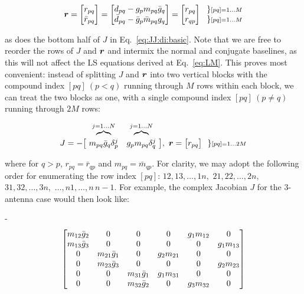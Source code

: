 \documentclass[useAMS,usenatbib]{mn2e}
\newcommand{\JJ}{J} %
\begin{document}
\[
\bmath{r} = \Matrix{c}{ r_{pq} \\ \bar{r}_{pq} } = \Matrix{c}{d_{pq}-g_p m_{pq}\bar{g}_q\\ \bar{d}_{pq}-\bar{g}_p \bar{m}_{pq}g_q} = 
\Matrix{c}{ r_{pq} \\ r_{qp} }~~ 
\Stack{ \} \scriptstyle [pq]=1\dots M \\ \} \scriptstyle [pq]=1\dots M }
\]

as does the bottom half of $\JJ$ in Eq.~\ref{eq:JJ:di:basic}. Note that we are free to reorder the rows of $\JJ$ and $\bmath{r}$ 
and intermix the normal and conjugate baselines, as this will not affect the LS equations derived at Eq.~\ref{eq:LM}.
This proves most convenient: instead of splitting $\JJ$ and $\bmath{r}$ into 
two vertical blocks with the compound index $[pq]~(p<q)$ running through $M$ rows within each block, we can treat 
the two blocks as one, with a single compound index $[pq]~(p\ne q)$ running through $2M$ rows:

\begin{equation}
\label{eq:JJ:di}
\begin{array}{r@{~}cc@{~}cc}
                & \overbrace{}^{j=1\dots N} & \overbrace{}^{j=1\dots N} \\
\JJ = - \big [ & m_{pq}\bar{g}_q\delta^{j}_p & g_p m_{pq} \delta^{j}_q & \big ],~
\bmath{r} = \big [ r_{pq} \big ] ~~{\} \scriptstyle [pq]=1\dots 2M}
\end{array}
\end{equation}

where for $q>p$, $r_{pq}=\bar{r}_{qp}$ and $m_{pq}=\bar{m}_{qp}$. For clarity, we may adopt the 
following order for enumerating the row index $[pq]$: $12,13,\dots,1n,$ $21,22,\dots,2n,$ $31,32,\dots,3n,$ $\dots,n1,\dots,n\,n-1$. 
For example, the complex Jacobian $\JJ$ for the 3-antenna case would then look like:

-\[
\Matrix{cccccc}{
  m_{12}\bar{g}_2 & 0               & 0 &  0          & g_1 m_{12} & 0           \\
  m_{13}\bar{g}_3 & 0               & 0 &  0          & 0          & g_1 m_{13}  \\
  0               & m_{21}\bar{g}_1 & 0 &  g_2 m_{21} & 0          & 0  \\
  0               & m_{23}\bar{g}_3 & 0 &  0          & 0          & g_2 m_{23} \\
  0               & 0               & m_{31}\bar{g}_1 & g_1 m_{31} & 0          & 0  \\
  0               & 0               & m_{32}\bar{g}_2 & 0 & g_3 m_{32} & 0 \\
}
\]
\end{document}
